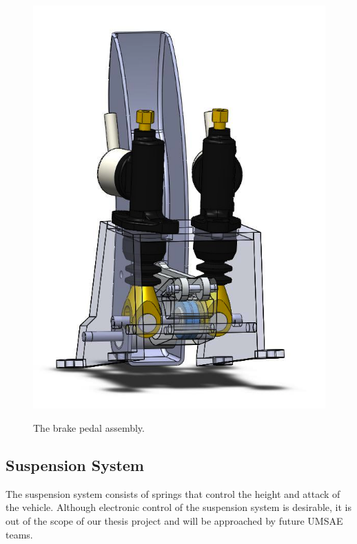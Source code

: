 \begin{figure}[h!]
{			\label{fig:brake_pedal_assy_b}\includegraphics[scale=0.4]{figures/brake_pedal_assy_b.png}}
    \caption{The brake pedal assembly.}
    \label{fig:brake_pedal_assy}
\end{figure}

\subsection{Suspension System}

The suspension system consists of springs that control the height and attack of the vehicle. Although electronic control of the suspension system is desirable, it is out of the scope of our thesis project and will be approached by future UMSAE teams.
